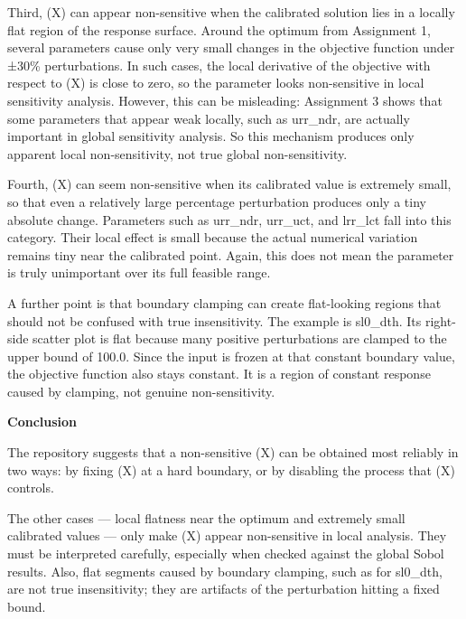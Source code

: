 Third, (X) can appear non-sensitive when the calibrated solution lies in a locally flat region of the response surface. Around the optimum from Assignment 1, several parameters cause only very small changes in the objective function under ±30\% perturbations. In such cases, the local derivative of the objective with respect to (X) is close to zero, so the parameter looks non-sensitive in local sensitivity analysis. However, this can be misleading: Assignment 3 shows that some parameters that appear weak locally, such as urr\_ndr, are actually important in global sensitivity analysis. So this mechanism produces only apparent local non-sensitivity, not true global non-sensitivity.

Fourth, (X) can seem non-sensitive when its calibrated value is extremely small, so that even a relatively large percentage perturbation produces only a tiny absolute change. Parameters such as urr\_ndr, urr\_uct, and lrr\_lct fall into this category. Their local effect is small because the actual numerical variation remains tiny near the calibrated point. Again, this does not mean the parameter is truly unimportant over its full feasible range.

A further point is that boundary clamping can create flat-looking regions that should not be confused with true insensitivity. The example is sl0\_dth. Its right-side scatter plot is flat because many positive perturbations are clamped to the upper bound of 100.0. Since the input is frozen at that constant boundary value, the objective function also stays constant. It is a region of constant response caused by clamping, not genuine non-sensitivity.

\vspace{0.5cm}
\noindent\textbf{Conclusion}

The repository suggests that a non-sensitive (X) can be obtained most reliably in two ways:
by fixing (X) at a hard boundary, or by disabling the process that (X) controls.

The other cases — local flatness near the optimum and extremely small calibrated values — only make (X) appear non-sensitive in local analysis. They must be interpreted carefully, especially when checked against the global Sobol results. Also, flat segments caused by boundary clamping, such as for sl0\_dth, are not true insensitivity; they are artifacts of the perturbation hitting a fixed bound.

